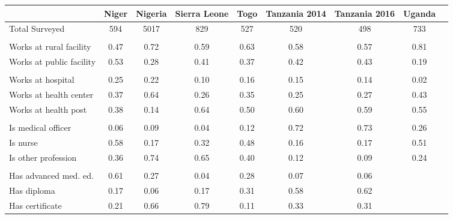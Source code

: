 \def\sym#1{\ifmmode^{#1}\else\(^{#1}\)\fi}
\begin{tabular}{l*{8}{c}}
\hline\hline
&\multicolumn{1}{c}{Niger}&\multicolumn{1}{c}{Nigeria}&\multicolumn{1}{c}{Sierra Leone}&\multicolumn{1}{c}{Togo}&\multicolumn{1}{c}{Tanzania 2014}&\multicolumn{1}{c}{Tanzania 2016}&\multicolumn{1}{c}{Uganda}&\\
\hline
Total Surveyed&                                {594}&        {5017}&        {829}&        {527}&       {520}&       {498}&       {733}\\
  &  {}\\
Works at rural facility&               {0.47}&        {0.72}&        {0.59}&        {0.63}&       {0.58}&       {0.57}&       {0.81}\\
Works at public facility&      {0.53}&        {0.28}&        {0.41}&        {0.37}&       {0.42}&       {0.43}&       {0.19}\\
 &   {}\\
Works at hospital&                     {0.25}&        {0.22}&        {0.10}&        {0.16}&       {0.15}&       {0.14}&       {0.02}\\
Works at health center&                {0.37}&        {0.64}&        {0.26}&        {0.35}&       {0.25}&       {0.27}&       {0.43}\\
Works at health post&                  {0.38}&        {0.14}&        {0.64}&        {0.50}&       {0.60}&       {0.59}&       {0.55}\\
 &   {}\\
Is medical officer&                    {0.06}&        {0.09}&        {0.04}&        {0.12}&       {0.72}&       {0.73}&       {0.26}\\
Is nurse&                                      {0.58}&        {0.17}&        {0.32}&        {0.48}&       {0.16}&       {0.17}&       {0.51}\\
Is other profession&                   {0.36}&        {0.74}&        {0.65}&        {0.40}&       {0.12}&       {0.09}&       {0.24}\\
&   {}\\
Has advanced med. ed.&                 {0.61}&        {0.27}&        {0.04}&        {0.28}&       {0.07}&       {0.06}&       {}\\
Has diploma&                                   {0.17}&        {0.06}&        {0.17}&        {0.31}&       {0.58}&       {0.62}&       {}\\
Has certificate&                               {0.21}&        {0.66}&        {0.79}&        {0.11}&       {0.33}&       {0.31}&       {}\\
\hline
\end{tabular}